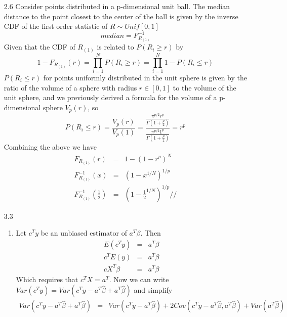 \documentclass{article}
\begin{document}
\renewcommand{\vec}[1]{\mathbf{#1}}
\newcommand{\ovec}[1]{\mathbf{\Omega_{#1}}}
\newcommand{\normfront}[1]{(#1\pi)^{-\frac{1}{2}}}




\begin{enumerate}
  \item[2.6] Consider points distributed in a p-dimensional unit ball. The median distance to the point closest to the center of the ball is given by the inverse CDF of the first order statistic of $R \sim Unif[0,1]$
  $$ median = F_{R_{(1)}}^{-1} $$
  Given that the CDF of $R_{(1)}$ is related to $P(R_i \ge r)$ by
  $$ 1 - F_{R_{(1)}}(r) = \prod_{i=1}^N P(R_i \ge r) = \prod_{i=1}^N 1-P(R_i \le r) $$
  $P(R_i \le r)$ for points uniformly distributed in the unit sphere is given by the ratio of the volume of a sphere with radius $r \in [0,1]$ to the volume of the unit sphere, and we previously derived a formula for the volume of a p-dimensional sphere $V_p(r)$, so
  $$ P(R_i \le r) = \frac{V_p(r)}{V_p(1)} = \frac{\frac{\pi^{p/2}r^p}{\Gamma(1 + \frac{p}{2})}}{\frac{\pi^{p/2}1^p}{\Gamma(1 + \frac{p}{2})}} = r^p$$
  Combining the above we have
  \begin{eqnarray*}
    F_{R_{(1)}}(r) &=& 1- (1-r^p)^N \\
    F_{R_{(1)}}^{-1}(x) &=& (1-x^{1/N})^{1/p} \\
    F_{R_{(1)}}^{-1}\left(\frac{1}{2}\right) &=& \left(1-\frac{1}{2}^{1/N}\right)^{1/p} //
  \end{eqnarray*}
  \item[3.3]
    \begin{enumerate}
      \item Let $c^Ty$ be an unbiased estimator of $a^T\beta$. Then
      \begin{eqnarray*}
        E(c^Ty) &=& a^T\beta \\
        c^TE(y) &=& a^T\beta \\
        cX^T\beta &=& a^T\beta
      \end{eqnarray*}
      Which requires that $c^TX = a^T$. Now we can write $Var(c^Ty) = Var(c^Ty - a^T\hat\beta + a^T\hat\beta)$ and simplify
      \begin{eqnarray*}
        Var(c^Ty - a^T\hat\beta + a^T\hat\beta) &=& Var(c^Ty - a^T\hat\beta) + 2Cov(c^Ty - a^T\hat\beta,a^T\hat\beta) + Var(a^T\hat\beta) \\        

\end{eqnarray*}
\end{enumerate}
\end{enumerate}
\end{document}
